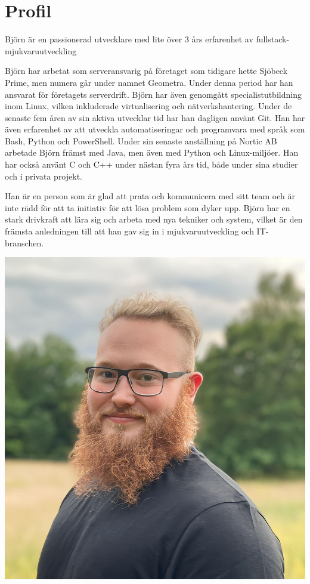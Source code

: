 \documentclass{article}
\begin{document}
\noindent
\begin{minipage}[t]{0.7\textwidth}
\vspace{-20pt} %
\section*{\textcolor{colorBlue}{Profil}}
Björn är en passionerad utvecklare med lite över 3 års erfarenhet av fullstack-mjukvaruutveckling 

\vspace{10pt}
Björn har arbetat som serveransvarig på företaget som tidigare hette Sjöbeck Prime, men numera går under namnet Geometra. Under denna period har han ansvarat för företagets serverdrift. Björn har även genomgått specialistutbildning inom Linux, vilken inkluderade virtualisering och nätverkshantering. Under de senaste fem åren av sin aktiva utvecklar tid har han dagligen använt Git. Han har även erfarenhet av att utveckla automatiseringar och programvara med språk som Bash, Python och PowerShell. Under sin senaste anställning på Nortic AB arbetade Björn främst med Java, men även med Python och Linux-miljöer. Han har också använt C och C++ under nästan fyra års tid, både under sina studier och i privata projekt.

\vspace{10pt}
Han är en person som är glad att prata och kommunicera med sitt team och är inte rädd för att ta initiativ för att lösa problem som dyker upp. Björn har en stark drivkraft att lära sig och arbeta med nya tekniker och system, vilket är den främsta anledningen till att han gav sig in i mjukvaruutveckling och IT-branschen.

\end{minipage}%
\hfill
\begin{minipage}[t]{0.28\textwidth}
\begin{minipage}[t]{0.8\textwidth}
\vspace{-10pt} %
  \includegraphics[width=\linewidth]{../../me.png}
  \label{fig:bild}
\end{minipage}

\end{minipage}
\end{document}
